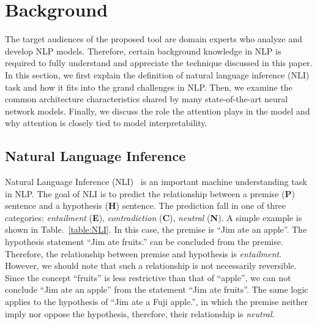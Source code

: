 \section{Background}
The target audiences of the proposed tool are domain experts who analyze and develop NLP models. Therefore, certain background knowledge in NLP is required to fully understand and appreciate the technique discussed in this paper. In this section, we first explain the definition of natural language inference (NLI) task and how it fits into the grand challenges in NLP. Then, we examine the common architecture characteristics shared by many state-of-the-art neural network models. Finally, we discuss the role the attention plays in the model and why attention is closely tied to model interpretability.

\subsection{Natural Language Inference}
\label{sec:languageInference}
Natural Language Inference (NLI)~\cite{DaganRothSammons2013} is an important machine understanding task in NLP.
The goal of NLI is to predict the relationship between a premise (\textbf{P}) sentence and a hypothesis (\textbf{H}) sentence. 
The prediction fall in one of three categories: \emph{entailment} (\textbf{E}), \emph{contradiction} (\textbf{C}), \emph{neutral} (\textbf{N}).
A simple example is shown in Table.~\ref{table:NLI}.
In this case, the premise is ``Jim ate an apple''. 
The hypothesis statement ``Jim ate fruits.'' can be concluded from the premise. Therefore, the relationship between premise and hypothesis is \emph{entailment}. However, we should note that such a relationship is not necessarily reversible. Since the concept ``fruits'' is less restrictive than that of ``apple'', we can not conclude ``Jim ate an apple'' from the statement ``Jim ate fruits''. The same logic applies to the hypothesis of ``Jim ate a Fuji apple.'', in which the premise neither imply nor oppose the hypothesis, therefore, their relationship is \emph{neutral}.


